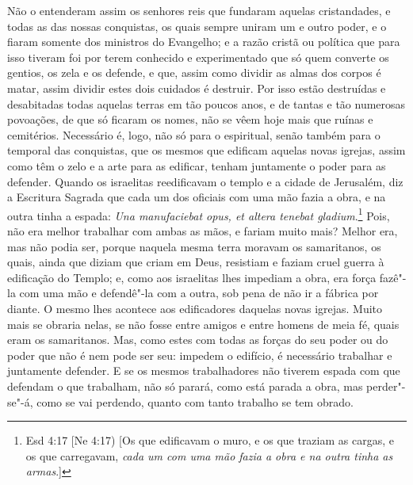 Não o entenderam assim os senhores reis que fundaram aquelas
cristandades, e todas as das nossas conquistas, os quais sempre uniram
um e outro poder, e o fiaram somente dos ministros do Evangelho; e a
razão cristã ou política que para isso tiveram foi por terem conhecido e
experimentado que só quem converte os gentios, os zela e os defende, e
que, assim como dividir as almas dos corpos é matar, assim dividir estes
dois cuidados é destruir. Por isso estão destruídas e desabitadas todas
aquelas terras em tão poucos anos, e de tantas e tão numerosas
povoações, de que só ficaram os nomes, não se vêem hoje mais que ruínas
e cemitérios. Necessário é, logo, não só para o espiritual, senão também
para o temporal das conquistas, que os mesmos que edificam aquelas novas
igrejas, assim como têm o zelo e a arte para as edificar, tenham
juntamente o poder para as defender. Quando os israelitas reedificavam o
templo e a cidade de Jerusalém, diz a Escritura Sagrada que cada um dos
oficiais com uma mão fazia a obra, e na outra tinha a espada: \emph{Una
manufaciebat opus, et altera tenebat gladium}.\footnote{Esd 4:17 [Ne 4:17) [Os que edificavam o muro, e os que traziam as cargas, e os que carregavam,
\emph{cada um com uma mão fazia a obra e na outra tinha as armas}.]}
Pois, não era melhor trabalhar com ambas as mãos, e fariam muito
mais? Melhor era, mas não podia ser, porque naquela mesma terra moravam
os samaritanos, os quais, ainda que diziam que criam em Deus, resistiam
e faziam cruel guerra à edificação do Templo; e, como aos israelitas
lhes impediam a obra, era força fazê"-la com uma mão e defendê"-la com a
outra, sob pena de não ir a fábrica por diante. O mesmo lhes acontece
aos edificadores daquelas novas igrejas. Muito mais se obraria nelas, se
não fosse entre amigos e entre homens de meia fé, quais eram os
samaritanos. Mas, como estes com todas as forças do seu poder ou do
poder que não é nem pode ser seu: impedem o edifício, é necessário
trabalhar e juntamente defender. E se os mesmos trabalhadores não
tiverem espada com que defendam o que trabalham, não só parará, como
está parada a obra, mas perder"-se"-á, como se vai perdendo, quanto com
tanto trabalho se tem obrado.

